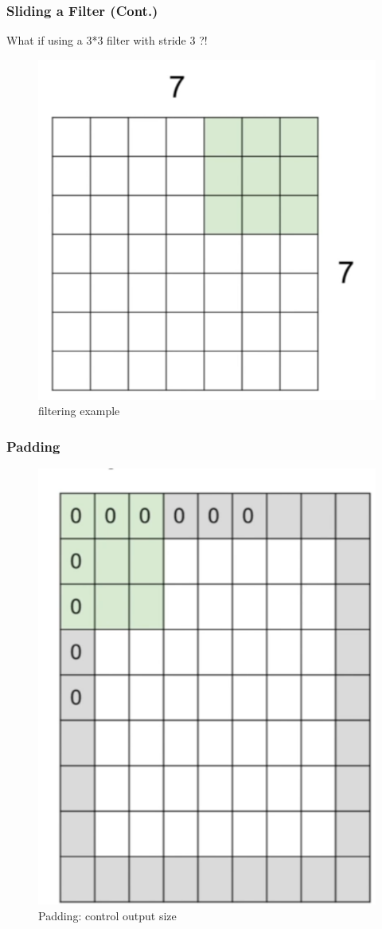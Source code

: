 \documentclass{beamer}
\begin{document}
\begin{frame}
\frametitle{Sliding a Filter (Cont.)}
 {\color{red}
 What if using a 3*3 filter with stride 3 ?!
	}
\begin{figure}
	\includegraphics[width=.5\linewidth]{Pics/clook4.png}
	\caption{filtering example}
\end{figure}

\end{frame}

\begin{frame}
\frametitle{Padding}
\begin{figure}
	\includegraphics[width=.4\linewidth]{Pics/padding.png}
	\caption{Padding: control output size}
\end{figure}
\end{frame}
\end{document}
